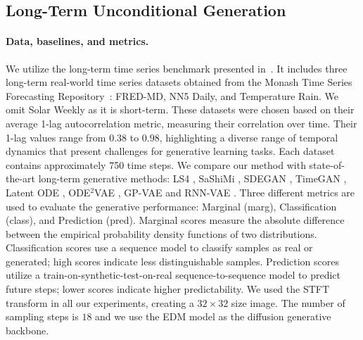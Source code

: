 \documentclass{article}
\begin{document}
\vspace{-1mm}

\subsection{Long-Term Unconditional Generation}
\label{subsec:experimets_long_time_series}

\paragraph{Data, baselines, and metrics.} We utilize the long-term time series benchmark presented in~\cite{zhou2023deep}. It includes three long-term real-world time series datasets obtained from the Monash Time Series Forecasting Repository~\cite{godahewa2021monash}: FRED-MD, NN5 Daily, and Temperature Rain. We omit Solar Weekly as it is short-term. These datasets were chosen based on their average 1-lag autocorrelation metric, measuring their correlation over time. Their 1-lag values range from $0.38$ to $0.98$, highlighting a diverse range of temporal dynamics that present challenges for generative learning tasks. Each dataset contains approximately 750 time steps. We compare our method with state-of-the-art long-term generative methods: LS4 \cite{zhou2023deep}, SaShiMi \cite{goel2022s}, SDEGAN \cite{kidger2021neural}, TimeGAN \cite{yoon2019time}, Latent ODE \cite{rubanova2019latent}, ODE$^{2}$VAE  \cite{yildiz2019ode2vae}, GP-VAE \cite{fortuin2020gp} and RNN-VAE \cite{chung2014empirical}. Three different metrics are used to evaluate the generative performance: Marginal (marg), Classification (class), and Prediction (pred). Marginal scores measure the absolute difference between the empirical probability density functions of two distributions. Classification scores use a sequence model to classify samples as real or generated; high scores indicate less distinguishable samples. Prediction scores utilize a train-on-synthetic-test-on-real sequence-to-sequence model to predict future steps; lower scores indicate higher predictability. We used the STFT transform in all our experiments, creating a $32 \times 32$ size image.  The number of sampling steps is $18$ and we use the EDM model \cite{karras2022elucidating} as the diffusion generative backbone.


\vspace{-1mm}
\end{document}
